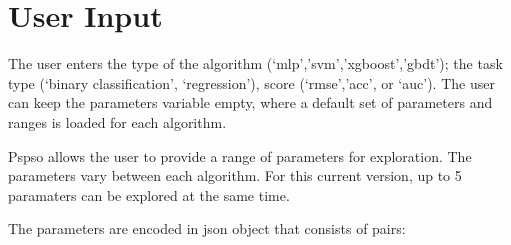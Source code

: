 \documentclass[letterpaper,10pt,english]{sphinxmanual}
\begin{document}
\section{User Input}
\label{\detokenize{index:user-input}}
The user enters the type of the algorithm (‘mlp’,’svm’,’xgboost’,’gbdt’); the task type (‘binary classification’,
‘regression’), score (‘rmse’,’acc’, or ‘auc’). The user can keep the parameters variable empty, where a default set of parameters and ranges is loaded
for each algorithm.

\begin{sphinxVerbatim}[commandchars=\\\{\}]
   
\end{sphinxVerbatim}

Pspso allows the user to provide a range of parameters for exploration.
The parameters vary between each algorithm.
For this current version, up to 5 paramaters can be explored at the same time.

The parameters are encoded in json object that consists of  pairs:

\begin{sphinxVerbatim}[commandchars=\\\{\}]
  
        \PYG{p}{[}\PYG{p}{]}
          \PYG{p}{[}\PYG{p}{]}
         \PYG{p}{[}\PYG{p}{]}
         \PYG{p}{[}\PYG{p}{]}
         \PYG{p}{[}\PYG{p}{]}
\end{sphinxVerbatim}
\end{document}
